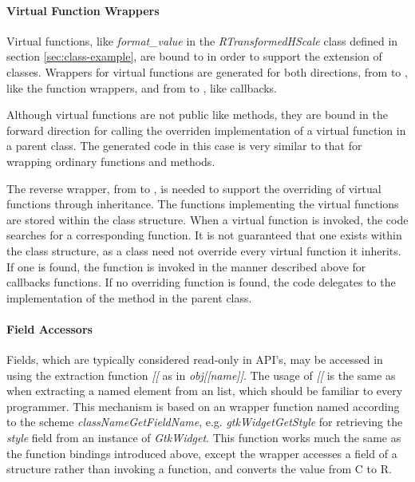 \documentclass[article]{jss}
\begin{document}
\paragraph{Virtual Function Wrappers}
Virtual functions, like \emph{format\_value} in the \emph{RTransformedHScale} class defined in section \ref{sec:class-example}, are bound to  in order to support the extension of  classes. Wrappers for virtual functions are generated for both directions, from  to , like the function wrappers, and from  to , like callbacks. 

Although virtual functions are not public like methods, they are bound in the forward direction for calling the overriden implementation of a virtual function in a parent class.  The generated code in this case is very similar to that for wrapping ordinary functions and methods.

The reverse wrapper, from  to , is needed to support the overriding of virtual functions through inheritance. The  functions implementing the virtual functions are stored within the  class structure. When a virtual function is invoked, the code searches for a corresponding  function. It is not guaranteed that one exists within the class structure, as a class need not override every virtual function it inherits. If one is found, the  function is invoked in the manner described above for callbacks functions. If no overriding function is found, the code delegates to the implementation of the method in the parent class.

\paragraph{Field Accessors}

Fields, which are typically considered read-only in
 API's, may be accessed in  using the extraction function \emph{[[} as in \emph{obj[[name]]}. The usage of \emph{[[} is the same as when extracting a named element from an  list, which should be familiar to every
 programmer. 
This mechanism is based on an 
wrapper function named according to the scheme
\emph{classNameGetFieldName}, e.g. \emph{gtkWidgetGetStyle} for retrieving the \emph{style} field from an instance of \emph{GtkWidget}. %
This function works much the same as the function bindings introduced
above, except the  wrapper accesses a field of a
 structure rather than invoking a function, and converts
the value from C to R.
\end{document}
